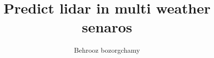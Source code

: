 \documentclass[11pt, twoside, openright, a4paper]{studdipl}
\title{Predict lidar in multi weather senaros}
\author{Behrooz bozorgchamy}
\begin{document}

\prepages

\maketitle

\cleardoublepage

\tableofcontents

\cleardoublepage

\mainbody



 

 


\begin{appendix}
	
\end{appendix}


\listoffigures


\printbibliography

\end{document}
